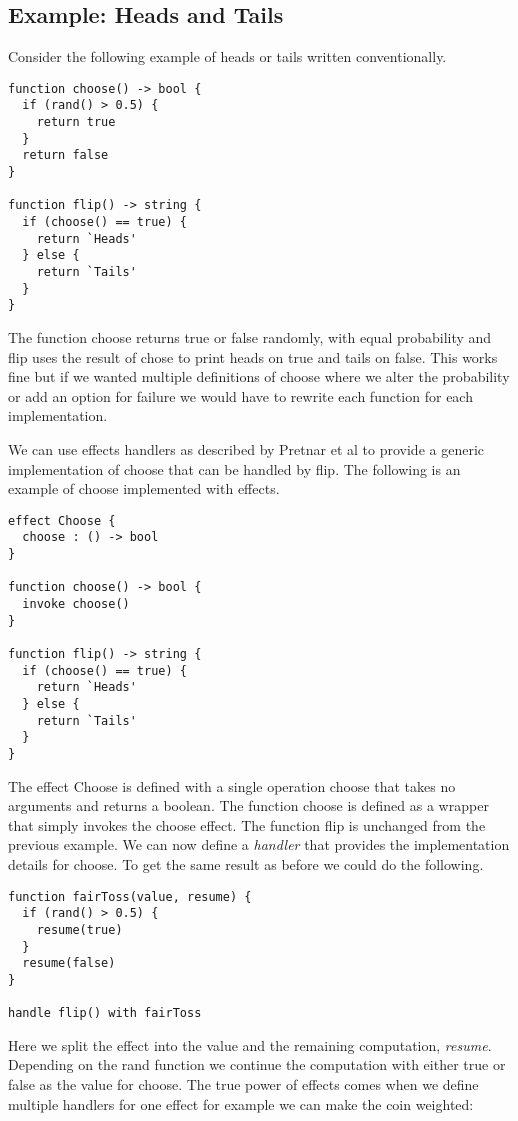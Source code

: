 \documentclass{report}
\begin{document}
\subsection{Example: Heads and Tails}

Consider the following example of heads or tails written
conventionally.

\begin{lstlisting}
function choose() -> bool {
  if (rand() > 0.5) {
    return true
  }
  return false
}

function flip() -> string {
  if (choose() == true) {
    return `Heads'
  } else {
    return `Tails'
  }
}
\end{lstlisting}

The function choose returns true or false randomly, with equal probability and
flip uses the result of chose to print heads on true and tails on false. This
works fine but if we wanted multiple definitions of choose where we alter the
probability or add an option for failure we would have to rewrite each function
for each implementation.

We can use effects handlers as described by Pretnar et al
\cite{pretnar2015introduction} to provide a generic implementation of choose
that can be handled by flip. The following is an example of choose implemented
with effects.

\begin{lstlisting}
effect Choose {
  choose : () -> bool
}

function choose() -> bool {
  invoke choose()
}

function flip() -> string {
  if (choose() == true) {
    return `Heads'
  } else {
    return `Tails'
  }
}
\end{lstlisting}

The effect Choose is defined with a single operation choose that takes no
arguments and returns a boolean. The function choose is defined as a wrapper
that simply invokes the choose effect. The function flip is unchanged from the
previous example. We can now define a \emph{handler} that provides the
implementation details for choose. To get the same result as before we could do
the following.

\begin{lstlisting}
function fairToss(value, resume) {
  if (rand() > 0.5) {
    resume(true)
  }
  resume(false)
}

handle flip() with fairToss
\end{lstlisting}

Here we split the effect into the value and the remaining computation,
\emph{resume}. Depending on the rand function we continue the computation with
either true or false as the value for choose. The true power of effects comes when we define multiple handlers for one effect for example we can make the coin weighted:
\end{document}
